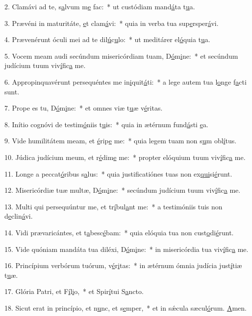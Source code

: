 2. Clamávi ad te, s\uline{a}lvum m\uline{e} fac:~* ut custódiam mand\uline{á}ta t\uline{u}a.\par 
3. Prævéni in maturitáte, \uline{e}t clam\uline{á}vi:~* quia in verba tua sup\uline{e}rsper\uline{á}vi.\par 
4. Prævenérunt óculi mei ad te dil\uline{ú}c\uline{u}lo:~* ut meditárer el\uline{ó}quia t\uline{u}a.\par 
5. Vocem meam audi secúndum misericórdiam tuam, D\uline{ó}m\uline{i}ne:~* et secúndum judícium tuum viv\uline{í}fic\uline{a} me.\par 
6. Appropinquavérunt persequéntes me in\uline{i}quit\uline{á}ti:~* a lege autem tua l\uline{o}nge f\uline{a}cti sunt.\par 
7. Prope es tu, D\uline{ó}m\uline{i}ne:~* et omnes viæ t\uline{u}æ v\uline{é}ritas.\par 
8. Inítio cognóvi de testim\uline{ó}niis t\uline{u}is:~* quia in ætérnum fund\uline{á}sti \uline{e}a.\par 
9. Vide humilitátem meam, et \uline{é}rip\uline{e} me:~* quia legem tuam non s\uline{u}m obl\uline{í}tus.\par 
10. Júdica judícium meum, et r\uline{é}dim\uline{e} me:~* propter elóquium tuum viv\uline{í}fic\uline{a} me.\par 
11. Longe a peccat\uline{ó}ribus s\uline{a}lus:~* quia justificatiónes tuas non ex\uline{qui}si\uline{é}runt.\par 
12. Misericórdiæ tuæ multæ, D\uline{ó}m\uline{i}ne:~* secúndum judícium tuum viv\uline{í}fic\uline{a} me.\par 
13. Multi qui persequúntur me, et tr\uline{í}bul\uline{a}nt me:~* a testimóniis tuis non d\uline{e}clin\uline{á}vi.\par 
14. Vidi prævaricántes, et t\uline{a}besc\uline{é}bam:~* quia elóquia tua non cust\uline{o}di\uline{é}runt.\par 
15. Vide quóniam mandáta tua diléxi, D\uline{ó}m\uline{i}ne:~* in misericórdia tua viv\uline{í}fic\uline{a} me.\par 
16. Princípium verbórum tuórum, v\uline{é}r\uline{i}tas:~* in ætérnum ómnia judícia just\uline{í}tiæ t\uline{u}æ.\par 
17. Glória Patri, et F\uline{í}l\uline{i}o,~* et Spir\uline{í}tui S\uline{a}ncto.\par 
18. Sicut erat in princípio, et n\uline{u}nc, et s\uline{e}mper,~* et in sǽcula sæcul\uline{ó}rum. \uline{A}men.\par 
